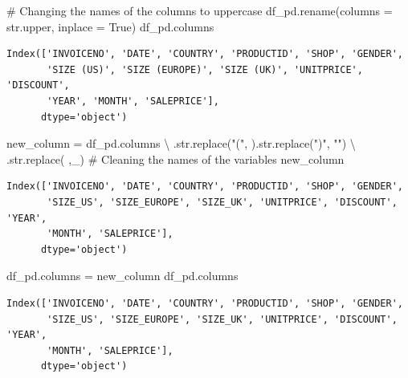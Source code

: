 \documentclass[
  letterpaper,
  DIV=11,
  numbers=noendperiod]{scrreprt}
\newenvironment{Shaded}{\begin{snugshade}}{\end{snugshade}}
\newcommand{\BuiltInTok}[1]{\textcolor[rgb]{0.00,0.23,0.31}{#1}}
\newcommand{\CommentTok}[1]{\textcolor[rgb]{0.37,0.37,0.37}{#1}}
\newcommand{\NormalTok}[1]{\textcolor[rgb]{0.00,0.23,0.31}{#1}}
\newcommand{\OperatorTok}[1]{\textcolor[rgb]{0.37,0.37,0.37}{#1}}
\newcommand{\StringTok}[1]{\textcolor[rgb]{0.13,0.47,0.30}{#1}}
\newcommand{\VariableTok}[1]{\textcolor[rgb]{0.07,0.07,0.07}{#1}}
\begin{document}
\begin{Shaded}
\begin{Highlighting}[]
\CommentTok{\# Changing the names of the columns to uppercase}
\NormalTok{df\_pd.rename(columns }\OperatorTok{=} \BuiltInTok{str}\NormalTok{.upper, inplace }\OperatorTok{=} \VariableTok{True}\NormalTok{)}
\NormalTok{df\_pd.columns}
\end{Highlighting}
\end{Shaded}

\begin{verbatim}
Index(['INVOICENO', 'DATE', 'COUNTRY', 'PRODUCTID', 'SHOP', 'GENDER',
       'SIZE (US)', 'SIZE (EUROPE)', 'SIZE (UK)', 'UNITPRICE', 'DISCOUNT',
       'YEAR', 'MONTH', 'SALEPRICE'],
      dtype='object')
\end{verbatim}

\begin{Shaded}
\begin{Highlighting}[]
\NormalTok{new\_column }\OperatorTok{=}\NormalTok{ df\_pd.columns }\OperatorTok{\textbackslash{}}
\NormalTok{ .}\BuiltInTok{str}\NormalTok{.replace(}\StringTok{"("}\NormalTok{, }\StringTok{\textquotesingle{}\textquotesingle{}}\NormalTok{).}\BuiltInTok{str}\NormalTok{.replace(}\StringTok{")"}\NormalTok{, }\StringTok{""}\NormalTok{) }\OperatorTok{\textbackslash{}}
\NormalTok{ .}\BuiltInTok{str}\NormalTok{.replace(}\StringTok{\textquotesingle{} \textquotesingle{}}\NormalTok{,}\StringTok{\textquotesingle{}\_\textquotesingle{}}\NormalTok{) }\CommentTok{\# Cleaning the names of the variables}
\NormalTok{new\_column}
\end{Highlighting}
\end{Shaded}

\begin{verbatim}
Index(['INVOICENO', 'DATE', 'COUNTRY', 'PRODUCTID', 'SHOP', 'GENDER',
       'SIZE_US', 'SIZE_EUROPE', 'SIZE_UK', 'UNITPRICE', 'DISCOUNT', 'YEAR',
       'MONTH', 'SALEPRICE'],
      dtype='object')
\end{verbatim}

\begin{Shaded}
\begin{Highlighting}[]
\NormalTok{df\_pd.columns }\OperatorTok{=}\NormalTok{ new\_column}
\NormalTok{df\_pd.columns}
\end{Highlighting}
\end{Shaded}

\begin{verbatim}
Index(['INVOICENO', 'DATE', 'COUNTRY', 'PRODUCTID', 'SHOP', 'GENDER',
       'SIZE_US', 'SIZE_EUROPE', 'SIZE_UK', 'UNITPRICE', 'DISCOUNT', 'YEAR',
       'MONTH', 'SALEPRICE'],
      dtype='object')
\end{verbatim}
\end{document}
